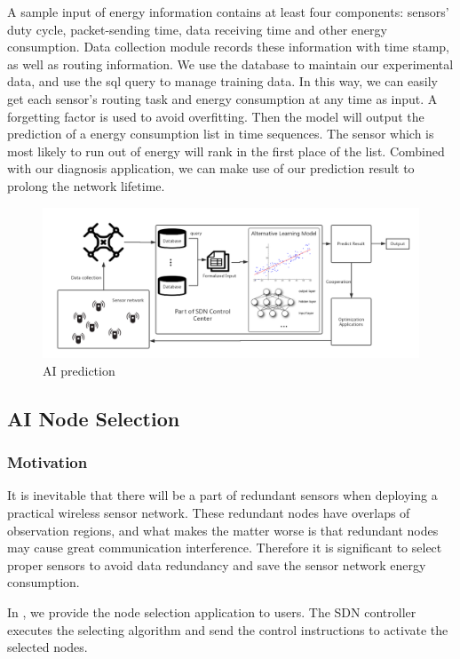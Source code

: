 A sample input of energy information contains at least four components: sensors'
duty cycle, packet-sending time, data receiving time and other energy
consumption. Data collection module records these information with time stamp,
as well as routing information. We use the database to maintain our experimental data,
and use the sql query to manage training data. In this way, we can easily
get each sensor's routing task and energy consumption at any time as input. A forgetting factor
is used to avoid overfitting. Then the model will output the prediction of a energy consumption list in time
sequences. The sensor which is most likely to run out of energy will rank in the first place of the list. 
Combined with our diagnosis application, we can make use of our prediction result to prolong the network
lifetime.


\begin{figure}[htbp]
	\centering
	\includegraphics[width=5in]{Figure/SDWN-AIprediction}
	\caption{AI prediction}
	\label{prediction}
\end{figure}


\subsection{AI Node Selection}

\subsubsection{Motivation}

It is inevitable that there will be a part of redundant sensors when deploying a 
practical wireless sensor network. These redundant nodes have overlaps of
observation regions, and what makes the matter worse is that redundant nodes
may cause great communication interference. Therefore it is significant to select 
proper sensors to avoid data redundancy and save the sensor network energy consumption.

In {\sdn}, we provide the node selection application to users. The SDN controller executes the 
selecting algorithm and send the control instructions to activate the selected nodes.

